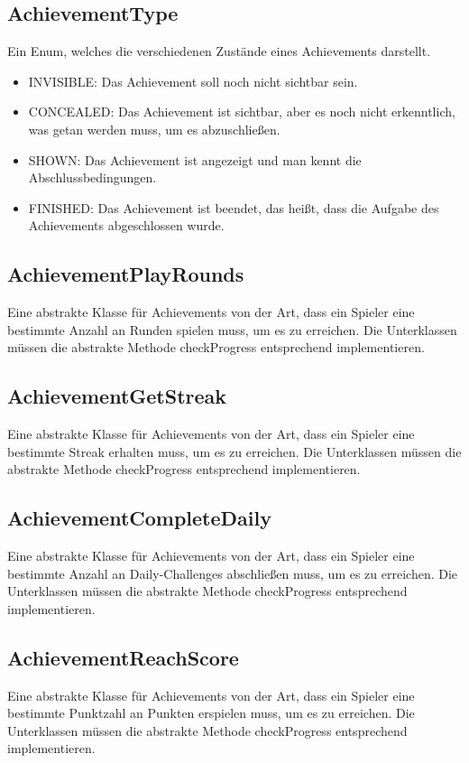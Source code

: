 \documentclass[a4paper]{scrreprt}
\begin{document}
	\subsection{AchievementType}
	Ein Enum, welches die verschiedenen Zustände eines Achievements darstellt.

	\begin{itemize}
		\item INVISIBLE: Das Achievement soll noch nicht sichtbar sein.
		\item CONCEALED: Das Achievement ist sichtbar, aber es noch nicht erkenntlich, was getan werden muss, um es abzuschließen.
		\item SHOWN: Das Achievement ist angezeigt und man kennt die Abschlussbedingungen.
		\item FINISHED: Das Achievement ist beendet, das heißt, dass die Aufgabe des Achievements abgeschlossen wurde.
	\end{itemize}

	\subsection{AchievementPlayRounds}
	Eine abstrakte Klasse für Achievements von der Art, dass ein Spieler eine bestimmte Anzahl an Runden spielen muss, um es zu erreichen. Die Unterklassen müssen die abstrakte Methode checkProgress entsprechend implementieren.

	\subsection{AchievementGetStreak}
	Eine abstrakte Klasse für Achievements von der Art, dass ein Spieler eine bestimmte Streak erhalten muss, um es zu erreichen. Die Unterklassen müssen die abstrakte Methode checkProgress entsprechend implementieren.

	\subsection{AchievementCompleteDaily}
	Eine abstrakte Klasse für Achievements von der Art, dass ein Spieler eine bestimmte Anzahl an Daily-Challenges abschließen muss, um es zu erreichen. Die Unterklassen müssen die abstrakte Methode checkProgress entsprechend implementieren.

	\subsection{AchievementReachScore}
	Eine abstrakte Klasse für Achievements von der Art, dass ein Spieler eine bestimmte Punktzahl an Punkten erspielen muss, um es zu erreichen. Die Unterklassen müssen die abstrakte Methode checkProgress entsprechend implementieren.
\end{document}
